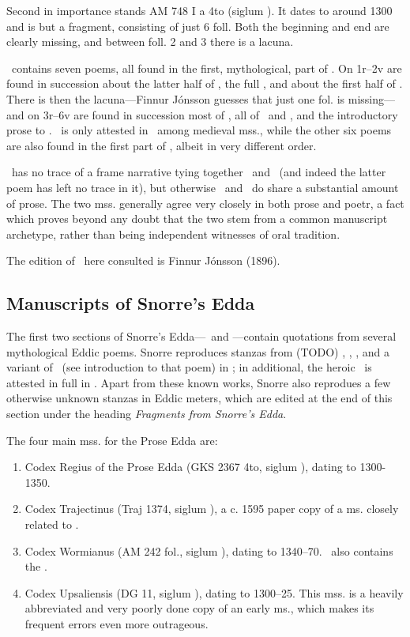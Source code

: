 Second in importance stands AM 748 I a 4to (siglum \AM).  It dates to around 1300 and is but a fragment, consisting of just 6 foll.  Both the beginning and end are clearly missing, and between foll. 2 and 3 there is a lacuna.

\AM\ contains seven poems, all found in the first, mythological, part of \Regius.  On 1r–2v are found in succession about the latter half of \Harbardsljod, the full \Baldrsdraumar, and about the first half of \Skirnismal.  There is then the lacuna—Finnur Jónsson guesses that just one fol. is missing—and on 3r–6v are found in succession most of \Vafthrudnismal, all of \Grimnismal\ and \Hymiskvida, and the introductory prose to \Volundarkvida.  \Baldrsdraumar\ is only attested in \AM\ among medieval mss., while the other six poems are also found in the first part of \Regius, albeit in very different order.

\AM\ has no trace of a frame narrative tying together \Hymiskvida\ and \Lokasenna\ (and indeed the latter poem has left no trace in it), but otherwise \AM\ and \Regius\ do share a substantial amount of prose.  The two mss. generally agree very closely in both prose and poetr, a fact which proves beyond any doubt that the two stem from a common manuscript archetype, rather than being independent witnesses of oral tradition.

The edition of \AM\ here consulted is Finnur Jónsson (1896).

\subsection{Manuscripts of Snorre’s Edda}

The first two sections of Snorre’s Edda—\Gylfaginning\ and \Skaldskaparmal—contain quotations from several mythological Eddic poems.  Snorre reproduces stanzas from (TODO) \Voluspa, \Vafthrudnismal, \Grimnismal, and a variant of \Lokasenna\ (see introduction to that poem) in \Gylfaginning; in additional, the heroic \Grottasongr\ is attested in full in \Skaldskaparmal.  Apart from these known works, Snorre also reprodues a few otherwise unknown stanzas in Eddic meters, which are edited at the end of this section under the heading \emph{Fragments from Snorre’s Edda}.

The four main mss. for the Prose Edda are:%

\begin{enumerate}
  \item Codex Regius of the Prose Edda (GKS 2367 4to, siglum \RegiusProse), dating to 1300-1350.
  \item Codex Trajectinus (Traj 1374, siglum \Trajectinus), a c. 1595 paper copy of a ms. closely related to \RegiusProse.
  \item Codex Wormianus (AM 242 fol., siglum \Wormianus), dating to 1340–70. \Wormianus\ also contains the \Rigsthula.
  \item Codex Upsaliensis (DG 11, siglum \Upsaliensis), dating to 1300–25.  This mss. is a heavily abbreviated and very poorly done copy of an early ms., which makes its frequent errors even more outrageous.
\end{enumerate}

